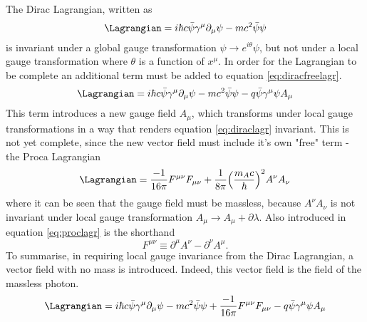 The Dirac Lagrangian, written as
\begin{equation} \label{eq:diracfreelagr}
    \Lagrangian=i\hbar c\bar{\psi}\gamma^{\mu}\partial_{\mu}\psi-mc^2\bar{\psi}\psi
\end{equation}
is invariant under a global gauge transformation $\psi\rightarrow e^{i\theta}\psi$, but not under a local gauge transformation where $\theta$ is a function of $x^{\mu}$. In order for the Lagrangian to be complete an additional term must be added to equation \ref{eq:diracfreelagr}. 
\begin{equation} \label{eq:diraclagr}
    \Lagrangian=i\hbar c\bar{\psi}\gamma^{\mu}\partial_{\mu}\psi-mc^2\bar{\psi}\psi-q\bar{\psi}\gamma^{\mu}\psi A_{\mu}
\end{equation}
This term introduces a new gauge field $A_{\mu}$, which transforms under local gauge transformations in a way that renders equation \ref{eq:diraclagr} invariant. This is not yet complete, since the new vector field must include it's own "free" term - the Proca Lagrangian
\begin{equation} \label{eq:proclagr}
    \Lagrangian=\dfrac{-1}{16\pi}F^{\mu\nu}F_{\mu\nu}+\dfrac{1}{8\pi}\Big(\dfrac{m_Ac}{\hbar}\Big)^2 A^{\nu}A_{\nu}
\end{equation}
where it can be seen that the gauge field must be massless, because $A^{\nu}A_{\nu}$ is not invariant under local gauge transformation $A_{\mu}\rightarrow A_{\mu}+\partial \lambda$. Also introduced in equation \ref{eq:proclagr} is the shorthand 
\begin{equation}
    F^{\mu\nu}\equiv\partial^{\mu}A^{\nu}-\partial^{\nu}A^{\mu}.
\end{equation}
To summarise, in requiring local gauge invariance from the Dirac Lagrangian, a vector field with no mass is introduced. Indeed, this vector field is the field of the massless photon.
\begin{equation}\label{eq:QEDlagr}
    \Lagrangian=i\hbar c\bar{\psi}\gamma^{\mu}\partial_{\mu}\psi-mc^2\bar{\psi}\psi+\dfrac{-1}{16\pi}F^{\mu\nu}F_{\mu\nu}-q\bar{\psi}\gamma^{\mu}\psi A_{\mu}
\end{equation}

